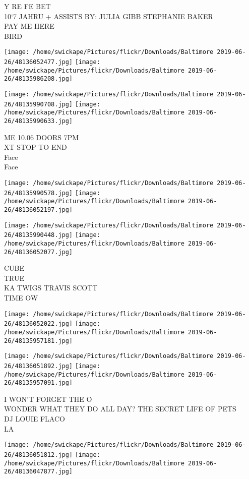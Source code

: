 \documentclass[10pt,letterpaper]{article}
\begin{document}
Y RE FE BET\\
10`7 JAHRU + ASSISTS BY: JULIA GIBB STEPHANIE BAKER\\
PAY ME HERE\\
BIRD
\pagebreak

\texttt{[image: /home/swickape/Pictures/flickr/Downloads/Baltimore 2019-06-26/48136052477.jpg]}
\texttt{[image: /home/swickape/Pictures/flickr/Downloads/Baltimore 2019-06-26/48135986208.jpg]}

\texttt{[image: /home/swickape/Pictures/flickr/Downloads/Baltimore 2019-06-26/48135990708.jpg]}
\texttt{[image: /home/swickape/Pictures/flickr/Downloads/Baltimore 2019-06-26/48135990633.jpg]}

ME 10.06 DOORS 7PM\\
XT STOP TO END\\
Face\\
Face
\pagebreak

\texttt{[image: /home/swickape/Pictures/flickr/Downloads/Baltimore 2019-06-26/48135990578.jpg]}
\texttt{[image: /home/swickape/Pictures/flickr/Downloads/Baltimore 2019-06-26/48136052197.jpg]}

\texttt{[image: /home/swickape/Pictures/flickr/Downloads/Baltimore 2019-06-26/48135990448.jpg]}
\texttt{[image: /home/swickape/Pictures/flickr/Downloads/Baltimore 2019-06-26/48136052077.jpg]}

CUBE\\
TRUE\\
KA TWIGS TRAVIS SCOTT\\
TIME OW
\pagebreak

\texttt{[image: /home/swickape/Pictures/flickr/Downloads/Baltimore 2019-06-26/48136052022.jpg]}
\texttt{[image: /home/swickape/Pictures/flickr/Downloads/Baltimore 2019-06-26/48135957181.jpg]}

\texttt{[image: /home/swickape/Pictures/flickr/Downloads/Baltimore 2019-06-26/48136051892.jpg]}
\texttt{[image: /home/swickape/Pictures/flickr/Downloads/Baltimore 2019-06-26/48135957091.jpg]}

I WON'T FORGET THE O\\
WONDER WHAT THEY DO ALL DAY?  THE SECRET LIFE OF PETS\\
DJ LOUIE FLACO\\
LA
\pagebreak

\texttt{[image: /home/swickape/Pictures/flickr/Downloads/Baltimore 2019-06-26/48136051812.jpg]}
\texttt{[image: /home/swickape/Pictures/flickr/Downloads/Baltimore 2019-06-26/48136047877.jpg]}
\end{document}
